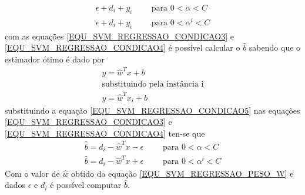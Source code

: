 \begin{align}
\epsilon  + d_{i} + y_{i} 	\qquad \textrm{ para } 0 < \alpha < C				\label{EQU_SVM_REGRESSAO_CONDICAO3}\\
\epsilon  + d_{i} + y_{i}	\qquad \textrm{ para }  0 < \alpha^{i} < C				\label{EQU_SVM_REGRESSAO_CONDICAO4}
\end{align}
com as equações \eqref{EQU_SVM_REGRESSAO_CONDICAO3} e \eqref{EQU_SVM_REGRESSAO_CONDICAO4} é possível calcular o \(\hat{b}\) sabendo que o estimador ótimo é dado por
\begin{align}
y = \hat{w}^{T}x + b \\
\nonumber\textrm{substituindo pela instância i} \\
y = \hat{w}^{T}x_{i} + b \label{EQU_SVM_REGRESSAO_CONDICAO5}
\end{align}
substituindo a equação \eqref{EQU_SVM_REGRESSAO_CONDICAO5} nas equações \eqref{EQU_SVM_REGRESSAO_CONDICAO3} e \eqref{EQU_SVM_REGRESSAO_CONDICAO4} ten-se que
\begin{align}
\hat{b} = d_{i} -\hat{w}^{T}x -\epsilon	\qquad \textrm{ para } 0 < \alpha < C		\label{EQU_SVM_REGRESSAO_CONDICAO6}\\
\hat{b} = d_{i} -\hat{w}^{T}x +\epsilon	\qquad \textrm{ para }  0 < \alpha^{i} < C	\label{EQU_SVM_REGRESSAO_CONDICAO7}
\end{align}
Com o valor de \(\hat{w}\) obtido da equação \eqref{EQU_SVM_REGRESSAO_PESO_W} e dados \(\epsilon\) e \(d_{i}\) é possível computar \(\hat{b}\).

